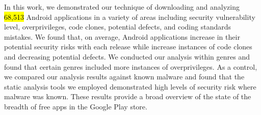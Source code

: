 In this work, we demonstrated our technique of downloading and analyzing \hl{68,513} Android applications in a variety of areas including security vulnerability level, overprivileges, code clones, potential defects, and coding standards mistakes. We found that, on average, Android applications increase in their potential security risks with each release while increase instances of code clones and decreasing potential defects. We conducted our analysis within genres and found that certain genres included more instances of overprivileges. As a control, we compared our analysis results against known malware and found that the static analysis tools we employed demonstrated high levels of security risk where malware was known. These results provide a broad overview of the state of the breadth of free apps in the Google Play store.




